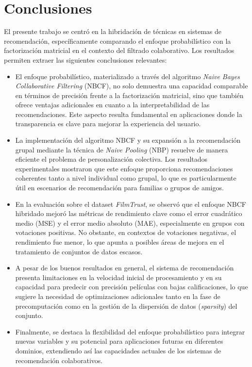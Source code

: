 \documentclass[twocolumn, fontsize=10pt]{article}
\begin{document}
\section{Conclusiones}

El presente trabajo se centró en la hibridación de 
técnicas en sistemas de recomendación, específicamente 
comparando el enfoque probabilístico con la 
factorización matricial en el contexto del filtrado 
colaborativo. Los resultados permiten extraer las 
siguientes conclusiones relevantes:

\begin{itemize}
    \item El enfoque probabilístico, materializado a través del algoritmo \textit{Naive Bayes Collaborative Filtering} (NBCF), no solo demuestra una capacidad comparable en términos de precisión frente a la factorización matricial, sino que también ofrece ventajas adicionales en cuanto a la interpretabilidad de las recomendaciones. Este aspecto resulta fundamental en aplicaciones donde la transparencia es clave para mejorar la experiencia del usuario.
    
    \item La implementación del algoritmo NBCF y su expansión a la recomendación grupal mediante la técnica de \textit{Naive Pooling} (NBP) resuelve de manera eficiente el problema de personalización colectiva. Los resultados experimentales mostraron que este enfoque proporciona recomendaciones coherentes tanto a nivel individual como grupal, lo que es particularmente útil en escenarios de recomendación para familias o grupos de amigos.

    \item En la evaluación sobre el dataset \textit{FilmTrust}, se observó que el enfoque NBCF hibridado mejoró las métricas de rendimiento clave como el error cuadrático medio (MSE) y el error medio absoluto (MAE), especialmente en grupos con votaciones positivas. No obstante, en contextos de votaciones negativas, el rendimiento fue menor, lo que apunta a posibles áreas de mejora en el tratamiento de conjuntos de datos escasos.

    \item A pesar de los buenos resultados en general, el sistema de recomendación presenta limitaciones en la velocidad inicial de procesamiento y en su capacidad para predecir con precisión películas con bajas calificaciones, lo que sugiere la necesidad de optimizaciones adicionales tanto en la fase de precomputación como en la gestión de la dispersión de datos (\textit{sparsity}) del conjunto.

    \item Finalmente, se destaca la flexibilidad del enfoque probabilístico para integrar nuevas variables y su potencial para aplicaciones futuras en diferentes dominios, extendiendo así las capacidades actuales de los sistemas de recomendación colaborativos.

\end{itemize}
\end{document}
